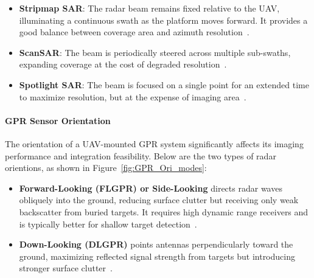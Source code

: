 \begin{itemize}
    \item \textbf{Stripmap SAR}: The radar beam remains fixed relative to the UAV, illuminating a continuous swath as the platform moves forward. It provides a good balance between coverage area and azimuth resolution~\cite{moreira2013tutorial}.
    \item \textbf{ScanSAR}: The beam is periodically steered across multiple sub-swaths, expanding coverage at the cost of degraded resolution~\cite{moreira2013tutorial}.
    \item \textbf{Spotlight SAR}: The beam is focused on a single point for an extended time to maximize resolution, but at the expense of imaging area~\cite{moreira2013tutorial}.
\end{itemize}


\paragraph{GPR Sensor Orientation}

The orientation of a UAV-mounted GPR system significantly affects its imaging performance and integration feasibility. Below are the two types of radar orientions, as shown in Figure~\ref{fig:GPR_Ori_modes}:

\begin{itemize}
    \item \textbf{Forward-Looking (FLGPR) or Side-Looking} directs radar waves obliquely into the ground, reducing surface clutter but receiving only weak backscatter from buried targets. It requires high dynamic range receivers and is typically better for shallow target detection~\cite{garcia2020airborne}.
    \item \textbf{Down-Looking (DLGPR)} points antennas perpendicularly toward the ground, maximizing reflected signal strength from targets but introducing stronger surface clutter~\cite{garcia2020airborne}.
\end{itemize}


